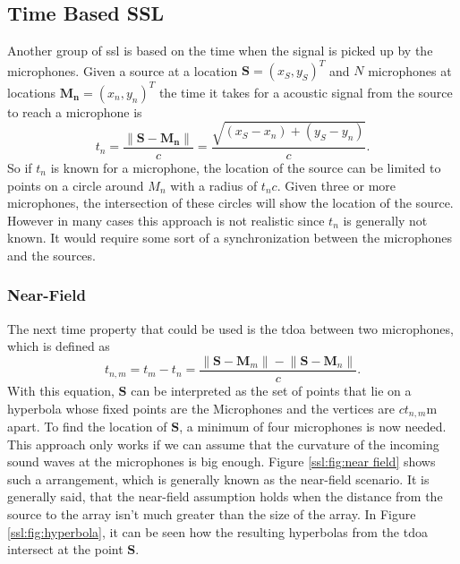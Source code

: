 \subsection{Time Based SSL}
Another group of \acrshort{ssl} is based on the time when the
signal is picked up by the microphones.
Given a source at a location $\bm{S} = (x_S,y_S)^T$ and $N$ microphones at locations
$\bm{M_n} = (x_n,y_n)^T$ the time it takes for a acoustic signal from the source to reach a microphone is
\begin{equation}
	t_n = \frac{\lVert \bm{S} - \bm{M_n}\rVert}{c}
	= \frac{\sqrt{\left(x_S - x_n\right) + \left(y_S - y_n\right)}}{c} .
\end{equation}
So if $t_n$ is known for a microphone, the location of the source can be limited to points on a circle
around $M_n$ with a radius of $t_n c$.
Given three or more microphones, the intersection of these circles will show the location of the source.
However in many cases this approach is not realistic since $t_n$ is generally not known.
It would require some sort of a synchronization between the microphones and the sources.
\subsubsection{Near-Field}
The next time property that could be used is the \acrfull{tdoa} between
two microphones, which is defined as
\begin{equation}
	t_{n, m} = t_m - t_n = \frac{\lVert \bm{S} - \bm{M}_m\rVert - \lVert \bm{S} - \bm{M}_n\rVert}{c}.
\end{equation}
With this equation, $\bm{S}$ can be interpreted as the set of points that lie on a hyperbola
whose fixed points are the Microphones and the vertices are $c t_{n,m}$m apart.
To find the location of $\bm{S}$, a minimum of four microphones is now needed.
This approach only works if we can assume that the curvature of the incoming sound waves
at the microphones is big enough. Figure \ref{ssl:fig:near field} shows such a arrangement,
which is generally known as the near-field scenario.
It is generally said, that the near-field assumption holds when the distance from the source
to the array isn't much greater than the size of the array.
In Figure \ref{ssl:fig:hyperbola}, it can be seen how the resulting hyperbolas from the
\acrshort{tdoa} intersect at the point $\bm{S}$.


